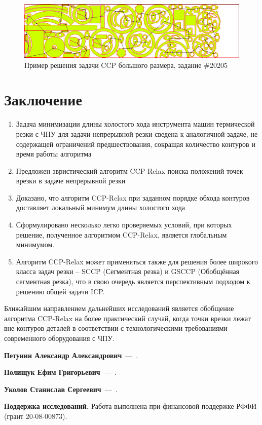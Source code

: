 \documentclass[10pt]{SPIIRAS_Proceedings}
\begin{document}
\begin{figure}
  \begin{center}
    \includegraphics[angle=90,height=0.8\textheight]{test5-ccp.png}
  \end{center}
  \caption{Пример решения задачи CCP большого размера, задание \#20205}
  \label{large-path}
\end{figure}

\section{Заключение}
\label{sec:conclude}

\begin{enumerate}
  \item
  Задача минимизации длины холостого хода инструмента
  машин термической резки с ЧПУ
  для задачи непрерывной резки
  сведена к аналогичной задаче,
  не содержащей ограничений предшествования,
  сокращая количество контуров и время работы алгоритма
  \item
  Предложен эвристический алгоритм CCP-Relax
  поиска положений точек врезки в задаче непрерывной резки
  \item
  Доказано, что алгоритм CCP-Relax
  при заданном порядке обхода контуров
  доставляет локальный минимум длины холостого хода
  \item
  Сформулировано несколько легко проверяемых условий,
  при которых решение, полученное алгоритмом CCP-Relax,
  является глобальным минимумом.
  \item
  Алгоритм CCP-Relax
  может применяться также для решения более широкого класса
  задач резки --
  SCCP (Сегментная резка) и
  GSCCP (Обобщённая сегментная резка),
  что в свою очередь является перспективным подходом
  к решению общей задачи
  ICP.
\end{enumerate}

Ближайшим направлением дальнейших исследований
является обобщение алгоритма CCP-Relax
на более практический случай,
когда точки врезки лежат вне контуров деталей
в соответствии с технологическими требованиями
современного оборудования с ЧПУ.

\printbibliography[title=Литература]

\begin{aboutAuthors}

\textbf{Петунин Александр Александрович}~---~.\smallskip

\textbf{Полищук Ефим Григорьевич}~---~.\smallskip

\textbf{Уколов Станислав Сергеевич}~---~.\smallskip

\textbf{Поддержка исследований.}
Работа выполнена при финансовой поддержке РФФИ (грант 20-08-00873).

\end{aboutAuthors}
\end{document}
